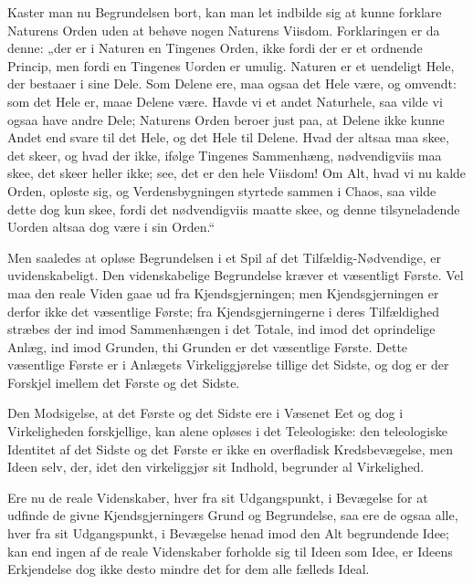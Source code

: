 \documentclass[12pt]{book}
\newcommand{\opage}[1]{\marginnote{\footnotesize\textit{[#1]}}}
\begin{document}
Kaster man nu Begrundelsen bort, kan man let indbilde sig at kunne forklare Naturens Orden uden at
behøve nogen Naturens Viisdom. Forklaringen er da denne: „der er i Naturen en Tingenes Orden, ikke
fordi der er et ordnende Princip, men
fordi en Tingenes Uorden er umulig. Naturen er et uendeligt Hele, der bestaaer i sine Dele. Som
Delene ere, maa ogsaa det Hele være, og omvendt: som det Hele er, maae Delene være. Havde vi et andet
Naturhele, saa vilde vi ogsaa have andre Dele; Naturens Orden beroer just paa, at Delene ikke kunne
Andet end svare til det Hele, og det Hele til Delene. Hvad der altsaa maa skee, det skeer, og hvad der
ikke, ifølge Tingenes Sammenhæng, nødvendigviis maa skee, det skeer heller ikke; see, det er den hele
Viisdom! Om Alt, hvad vi nu kalde Orden, opløste sig, og Verdensbygningen styrtede sammen i Chaos, saa
vilde dette dog kun skee,
fordi det nødvendigviis
\opage{190} maatte skee, og denne tilsyneladende Uorden altsaa dog være i sin Orden.“

Men saaledes at opløse Begrundelsen i et Spil af det Tilfældig-Nødvendige, er uvidenskabeligt. Den
videnskabelige Begrundelse kræver et væsentligt Første. Vel maa den reale Viden gaae ud fra
Kjendsgjerningen; men Kjendsgjerningen er derfor ikke det væsentlige Første; fra Kjendsgjerningerne i
deres Tilfældighed stræbes der ind imod Sammenhængen i det Totale, ind imod det oprindelige Anlæg, ind
imod Grunden, thi Grunden er det væsentlige Første. Dette væsentlige Første er i Anlægets
Virkeliggjørelse tillige det Sidste, og dog er der Forskjel imellem det Første og det Sidste.

Den Modsigelse, at det Første og det Sidste ere i Væsenet Eet og dog i Virkeligheden forskjellige, kan
alene opløses i det Teleologiske: den teleologiske Identitet af det Sidste og det Første er ikke en
overfladisk Kredsbevægelse, men Ideen selv, der, idet den virkeliggjør sit Indhold, begrunder al
Virkelighed.

Ere nu de reale Videnskaber, hver fra sit Udgangspunkt, i Bevægelse for at udfinde de givne
Kjendsgjerningers Grund og Begrundelse, saa ere de ogsaa alle, hver fra sit Udgangspunkt, i Bevægelse
henad imod den Alt begrundende Idee; kan end ingen af de reale Videnskaber forholde sig til Ideen som
Idee, er Ideens Erkjendelse dog ikke desto mindre det for dem alle fælleds Ideal.
\end{document}
